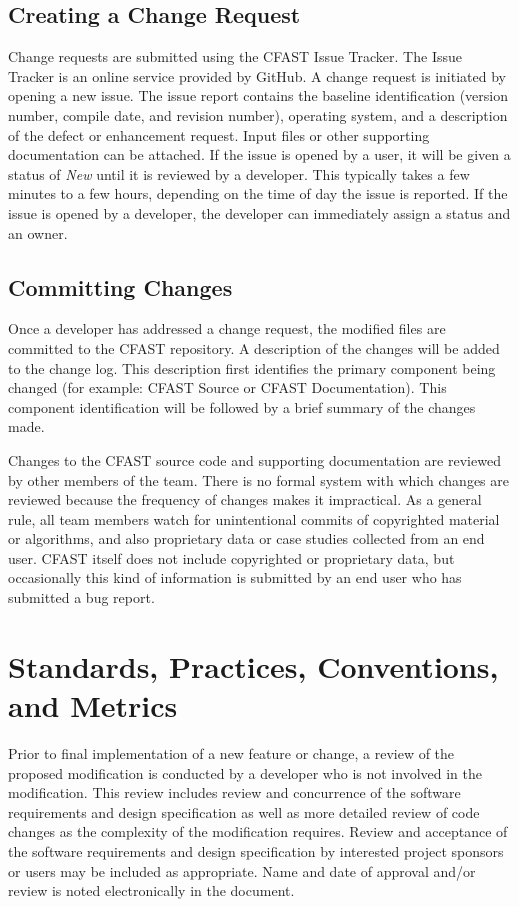 \documentclass[12pt]{book}
\begin{document}
\subsection{Creating a Change Request}

Change requests are submitted using the CFAST Issue Tracker.  The Issue Tracker is an online service provided by GitHub. A change request is initiated by opening a new issue.  The issue report contains the baseline identification (version number, compile date, and revision number), operating system, and a description of the defect or enhancement request.  Input files or other supporting documentation can be attached. If the issue is opened by a user, it will be given a status of {\em New} until it is reviewed by a developer. This typically takes a few minutes to a few hours, depending on the time of day the issue is reported. If the issue is opened by a developer, the developer can immediately assign a status and an owner.


\subsection{Committing Changes}

Once a developer has addressed a change request, the modified files are committed to the CFAST repository.  A description of the changes will be added to the change log.  This description first identifies the primary component being changed (for example: CFAST Source or CFAST Documentation).  This component identification will be followed by a brief summary of the changes made.

Changes to the CFAST source code and supporting documentation are reviewed by other members of the team. There is no formal system with which changes are reviewed because the frequency of changes makes it impractical. As a general rule, all team members watch for unintentional commits of copyrighted material or algorithms, and also proprietary data or case studies collected from an end user. CFAST itself does not include copyrighted or proprietary data, but occasionally this kind of information is submitted by an end user who has submitted a bug report.

\section{Standards, Practices, Conventions, and Metrics}

Prior to final implementation of a new feature or change, a review of the proposed modification is conducted by a developer who is not involved in the modification.  This review includes review and concurrence of the software requirements and design specification as well as more detailed review of code changes as the complexity of the modification requires. Review and acceptance of the software requirements and design specification by interested project sponsors or users may be included as appropriate. Name and date of approval and/or review is noted electronically in the document.
\end{document}
